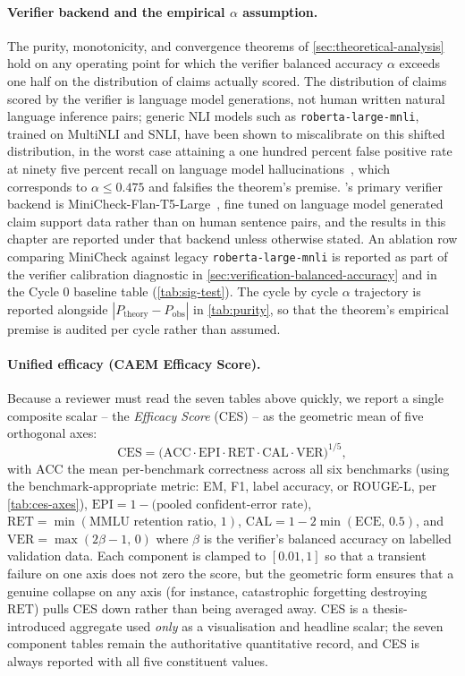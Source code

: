 \paragraph{Verifier backend and the empirical $\alpha$ assumption.}
The purity, monotonicity, and convergence theorems of
\cref{sec:theoretical-analysis} hold on any operating point for which
the verifier balanced accuracy $\alpha$ exceeds one half on the
distribution of claims actually scored. The distribution of claims
scored by the \caem{} verifier is language model generations, not
human written natural language inference pairs; generic NLI models
such as \texttt{roberta-large-mnli}, trained on MultiNLI and SNLI, have
been shown to miscalibrate on this shifted distribution, in the worst
case attaining a one hundred percent false positive rate at ninety
five percent recall on language model
hallucinations~\cite{semanticillusion2025}, which corresponds to
$\alpha \le 0.475$ and falsifies the theorem's premise. \caem{}'s
primary verifier backend is MiniCheck-Flan-T5-Large~\cite{tang2024minicheck},
fine tuned on language model generated claim support data rather than
on human sentence pairs, and the results in this chapter are reported
under that backend unless otherwise stated. An ablation row comparing
MiniCheck against legacy \texttt{roberta-large-mnli} is reported as
part of the verifier calibration diagnostic in
\cref{sec:verification-balanced-accuracy} and in the Cycle 0 baseline
table (\cref{tab:sig-test}). The cycle by cycle $\alpha$ trajectory is
reported alongside $|P_{\text{theory}} - P_{\text{obs}}|$ in
\cref{tab:purity}, so that the theorem's empirical premise is
audited per cycle rather than assumed.

\paragraph{Unified efficacy (CAEM Efficacy Score).}
Because a reviewer must read the seven tables above quickly, we report
a single composite scalar -- the \emph{\caem{} Efficacy Score} (CES) --
as the geometric mean of five orthogonal axes:
\[
\mathrm{CES} = \bigl(\mathrm{ACC} \cdot \mathrm{EPI} \cdot \mathrm{RET}
                    \cdot \mathrm{CAL} \cdot \mathrm{VER}\bigr)^{1/5},
\]
with $\mathrm{ACC}$ the mean per-benchmark correctness across all
six benchmarks (using the benchmark-appropriate metric: EM, F1,
label accuracy, or ROUGE-L, per \cref{tab:ces-axes}),
$\mathrm{EPI} = 1 - \text{(pooled confident-error rate)}$,
$\mathrm{RET} = \min(\text{MMLU retention ratio},\,1)$,
$\mathrm{CAL} = 1 - 2\min(\mathrm{ECE},\,0.5)$,
and $\mathrm{VER} = \max(2\beta - 1,\,0)$ where $\beta$ is the
verifier's balanced accuracy on labelled validation data. Each
component is clamped to $[0.01, 1]$ so that a transient failure on
one axis does not zero the score, but the geometric form ensures
that a genuine collapse on any axis (for instance, catastrophic
forgetting destroying $\mathrm{RET}$) pulls CES down rather than
being averaged away. CES is a thesis-introduced aggregate used
\emph{only} as a visualisation and headline scalar; the seven
component tables remain the authoritative quantitative record, and
CES is always reported with all five constituent values.

